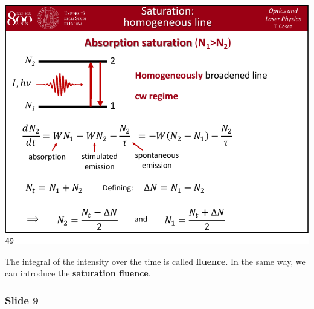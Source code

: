 \documentclass[../main/main.tex]{subfiles}
\begin{document}
\begin{minipage}[]{0.5\linewidth}
\centering
\includegraphics[page=8,width=1\textwidth]{../lessons/pdf_file/10_lecture.pdf}
\end{minipage}
\hspace{0.3cm}\vspace{0.3cm}
\begin{minipage}[c]{0.47\linewidth}

The integral of the intensity over the time is called \textbf{fluence}.
In the same way, we can introduce the \textbf{saturation fluence}.

\end{minipage}

\subsubsection*{Slide 9}
\end{document}
